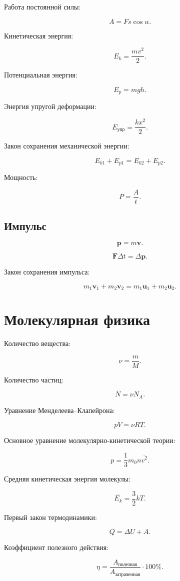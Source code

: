 \documentclass[12pt,a4paper]{article}
\theoremstyle{definition}
\theoremstyle{remark}
\newcommand{\vect}[1]{\bm{#1}}
\begin{document}
Работа постоянной силы:

\[
    A=Fs\cos\alpha.
\]

Кинетическая энергия:

\[
    E_k=\frac{mv^2}{2}.
\]

Потенциальная энергия:

\[
    E_p=mgh.
\]

Энергия упругой деформации:

\[
    E_{\text{упр}}
    =
    \frac{kx^2}{2}.
\]

Закон сохранения механической энергии:

\[
    E_{k1}+E_{p1}
    =
    E_{k2}+E_{p2}.
\]

Мощность:

\[
    P=\frac{A}{t}.
\]

\subsection{Импульс}

\[
    \vect{p}=m\vect{v}.
\]

\[
    \vect{F}\Delta t=\Delta\vect{p}.
\]

Закон сохранения импульса:

\[
    m_1\vect{v}_1+m_2\vect{v}_2
    =
    m_1\vect{u}_1+m_2\vect{u}_2.
\]

\section{Молекулярная физика}

Количество вещества:

\[
    \nu=\frac{m}{M}.
\]

Количество частиц:

\[
    N=\nu N_A.
\]

Уравнение Менделеева--Клапейрона:

\[
    pV=\nu RT.
\]

Основное уравнение молекулярно-кинетической теории:

\[
    p
    =
    \frac{1}{3}m_0n\overline{v^2}.
\]

Средняя кинетическая энергия молекулы:

\[
    \overline{E_k}
    =
    \frac{3}{2}kT.
\]

Первый закон термодинамики:

\[
    Q=\Delta U+A.
\]

Коэффициент полезного действия:

\[
    \eta
    =
    \frac{A_{\text{полезная}}}
    {A_{\text{затраченная}}}
    \cdot100\%.
\]
\end{document}
